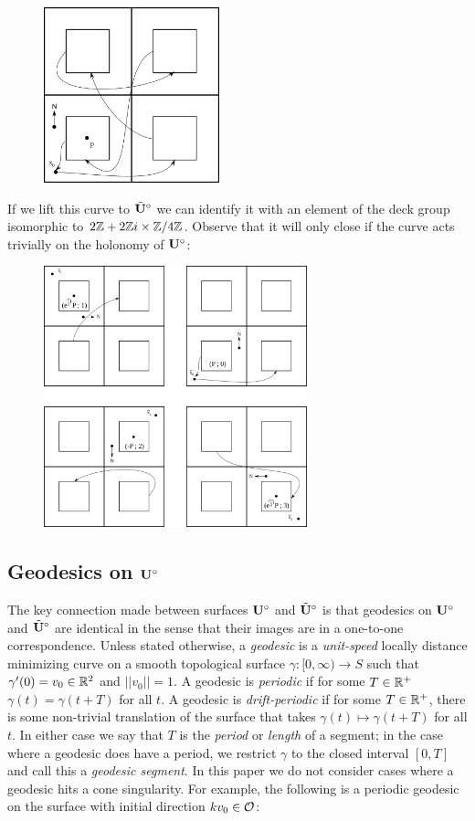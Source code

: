 \documentclass[]{article}
\def\btUs{\btU^\circ}
\begin{document}
\begin{figure}[H]
\centering
\includegraphics[width=2in]{overlay.png}
\end{figure}

\noindent If we lift this curve to $\btUs$ we can identify it with an element of the deck group isomorphic to $2\mathbb{Z}+2\mathbb{Z} i \times \mathbb{Z}/4\mathbb{Z}$. Observe that it will only close if the curve acts trivially on the holonomy of $\mathbf{U}^\circ$:

\begin{figure}[H]
\centering
\includegraphics[width=3in]{coverdirection.png}
\end{figure}


\subsection{Geodesics on $\mathbf{U}^\circ$}
The key connection made between surfaces $\mathbf{U}^\circ$ and $\btUs$ is that geodesics on $\mathbf{U}^\circ$ and $\btUs$ are identical in the sense that their images are in a one-to-one correspondence. Unless stated otherwise, a \emph{geodesic} is a \emph{unit-speed} locally distance minimizing curve on a smooth topological surface $\gamma:[0,\infty)\rightarrow S$ such that $\gamma'(0)=v_0\in\mathbb{R}^2$ and $|| v_0||=1$. A geodesic is \emph{periodic} if for some $T\in\mathbb{R}^+$ $\gamma(t)=\gamma(t+T)$ for all $t$. A geodesic is \emph{drift-periodic} if for some $T\in\mathbb{R}^+$, there is some non-trivial translation of the surface that takes $\gamma(t)\mapsto \gamma(t+T)$ for all $t$. In either case we say that $T$ is the \emph{period} or \emph{length} of a segment; in the case where a geodesic does have a period, we restrict $\gamma$ to the closed interval $[0,T]$ and call this a \emph{geodesic segment}. In this paper we do not consider cases where a geodesic hits a cone singularity. For example, the following is a periodic geodesic on the surface with initial direction $kv_0\in\mathcal{O}$:
\end{document}
